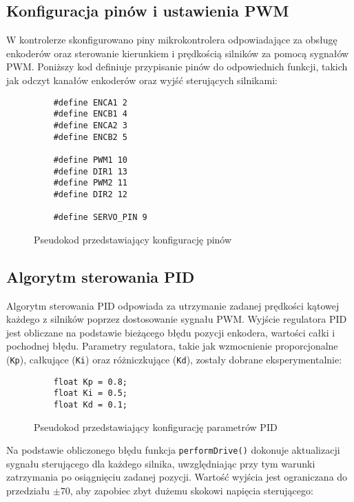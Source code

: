 \subsection{Konfiguracja pinów i ustawienia PWM}

W kontrolerze skonfigurowano piny mikrokontrolera odpowiadające za obsługę enkoderów oraz sterowanie kierunkiem i prędkością silników za pomocą sygnałów PWM. Poniższy kod definiuje przypisanie pinów do odpowiednich funkcji, takich jak odczyt kanałów enkoderów oraz wyjść sterujących silnikami:

\begin{figure}
  \centering
  \begin{lstlisting}
    #define ENCA1 2 
    #define ENCB1 4 
    #define ENCA2 3 
    #define ENCB2 5 
    
    #define PWM1 10
    #define DIR1 13
    #define PWM2 11
    #define DIR2 12
    
    #define SERVO_PIN 9
  \end{lstlisting}
  \caption{Pseudokod przedstawiający konfigurację pinów}
  \label{fig:pseudokod:config}
  \end{figure}

\subsection{Algorytm sterowania PID}

Algorytm sterowania PID odpowiada za utrzymanie zadanej prędkości kątowej każdego z silników poprzez dostosowanie sygnału PWM. Wyjście regulatora PID jest obliczane na podstawie bieżącego błędu pozycji enkodera, wartości całki i pochodnej błędu. Parametry regulatora, takie jak wzmocnienie proporcjonalne (\texttt{Kp}), całkujące (\texttt{Ki}) oraz różniczkujące (\texttt{Kd}), zostały dobrane eksperymentalnie:

\begin{figure}[H]
  \centering
  \begin{lstlisting}
    float Kp = 0.8; 
    float Ki = 0.5; 
    float Kd = 0.1; 
  \end{lstlisting}
  \caption{Pseudokod przedstawiający konfigurację parametrów PID}
  \label{fig:pseudokod:config-pid}
  \end{figure}

Na podstawie obliczonego błędu funkcja \texttt{performDrive()} dokonuje aktualizacji sygnału sterującego dla każdego silnika, uwzględniając przy tym warunki zatrzymania po osiągnięciu zadanej pozycji. Wartość wyjścia jest ograniczana do przedziału \( \pm 70 \), aby zapobiec zbyt dużemu skokowi napięcia sterującego:

